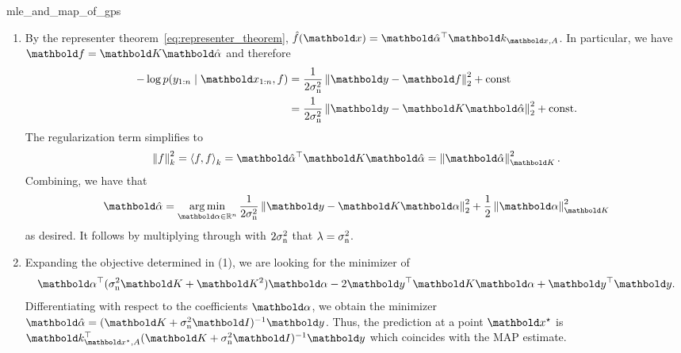 \begin{solution}{mle_and_map_of_gps}
  \begin{enumerate}[beginpenalty=10000]
    \item By the representer theorem~\eqref{eq:representer_theorem}, $\hat{f}(\vx) = \transpose{\valphahat} \vk_{\vx,A}$.
    In particular, we have $\vf = \mK \valphahat$ and therefore \begin{align*}
      - \log p(y_{1:n} \mid \vx_{1:n}, f) &= \frac{1}{2 \sigman^2} \norm{\vy - \vf}_2^2 + \const \\
      &= \frac{1}{2 \sigman^2} \norm{\vy - \mK \valphahat}_2^2 + \const.
    \end{align*}
    The regularization term simplifies to \begin{align*}
      \norm{f}_k^2 = \ip{f,f}_k = \transpose{\valphahat} \mK \valphahat = \norm{\valphahat}_{\mK}^2.
    \end{align*}
    Combining, we have that \begin{align*}
      \valphahat = \argmin_{\valpha \in \R^n} \frac{1}{2 \sigman^2} \norm{\vy - \mK \valpha}_2^2 + \frac{1}{2} \norm{\valpha}_{\mK}^2
    \end{align*} as desired.
    It follows by multiplying through with $2 \sigma_{\mathrm{n}}^2$ that $\lambda = \sigma_{\mathrm{n}}^2$.

    \item Expanding the objective determined in (1), we are looking for the minimizer of \begin{align*}
      \transpose{\valpha} (\sigman^2 \mK + \mK^2) \valpha - 2 \transpose{\vy} \mK \valpha + \transpose{\vy} \vy.
    \end{align*}
    Differentiating with respect to the coefficients $\valpha$, we obtain the minimizer $\valphahat = \inv{(\mK + \sigman^2 \mI)} \vy$.
    Thus, the prediction at a point $\vxs$ is $\transpose{\vk_{\vxs,A}} \inv{(\mK + \sigman^2 \mI)} \vy$ which coincides with the MAP estimate.
  \end{enumerate}
\end{solution}

